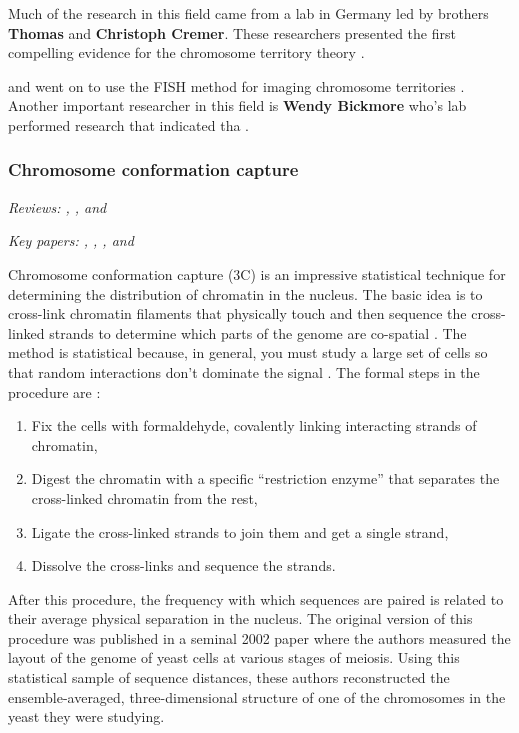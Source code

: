 \documentclass[12pt]{article}
\begin{document}
Much of the research in this field came from a lab in Germany led by brothers
{\bf Thomas} and {\bf Christoph Cremer}.
These researchers presented the first compelling evidence for the chromosome
territory theory \cite{hamster}.


 and went on to use the FISH method for imaging
chromosome territories \cite{cremer}.
Another important researcher in this field is {\bf Wendy Bickmore} who's lab
performed research that indicated tha \cite{local}.


\subsubsection*{Chromosome conformation capture}

\emph{Reviews: \cite{3c-review1}, \cite{3c-review2}, and \cite{3c-review3}}

\noindent\emph{Key papers: \cite{ccc}, \cite{looping}, \cite{4c}, and
\cite{5c}}

Chromosome conformation capture (3C) is an impressive statistical technique
for determining the distribution of chromatin in the nucleus.
The basic idea is to cross-link chromatin filaments that physically touch and
then sequence the cross-linked strands to determine which parts of the genome
are co-spatial \cite{3c-review1}.
The method is statistical because, in general, you must study a large set of
cells so that random interactions don't dominate the signal \cite{3c-review2}.
The formal steps in the procedure are \cite{3c-review1, 3c-review2}:
\begin{enumerate}

\item Fix the cells with formaldehyde, covalently linking interacting strands
of chromatin,

\item Digest the chromatin with a specific ``restriction enzyme'' that
separates the cross-linked chromatin from the rest,

\item Ligate the cross-linked strands to join them and get a single strand,

\item Dissolve the cross-links and sequence the strands.

\end{enumerate}
After this procedure, the frequency with which sequences are paired is related
to their average physical separation in the nucleus.
The original version of this procedure was published in a seminal 2002 paper
\cite{ccc} where the authors measured the layout of the genome of yeast cells
at various stages of meiosis.
Using this statistical sample of sequence distances, these authors
reconstructed the ensemble-averaged, three-dimensional structure of one of the
chromosomes in the yeast they were studying.
\end{document}
